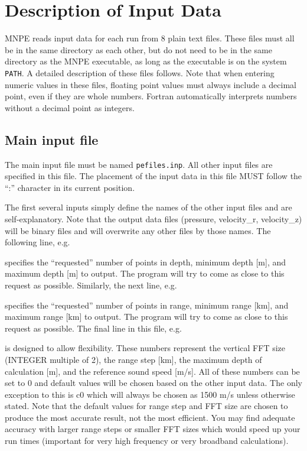 \section{Description of Input Data}

MNPE reads input data for each run from 8 plain text files. These files must all be in the same directory as each other, but do not need to be in the same directory as the MNPE executable, as long as the executable is on the system \texttt{PATH}. A detailed description of these files follows. Note that when entering numeric values in these files, floating point values must always include a decimal point, even if they are whole numbers. Fortran automatically interprets numbers without a decimal point as integers.

\subsection{Main input file}

The main input file must be named \texttt{pefiles.inp}. All other input files are specified in this file. The placement of the input data in this file MUST follow the ``:'' character in its current position. 



The first several inputs simply define the names of the other input files and are self-explanatory. Note that the output data files (pressure, velocity\_r, velocity\_z) will be binary files and will overwrite any other files by those names. The following line, e.g.

specifies the ``requested'' number of points in depth, minimum depth [m], and maximum depth [m] to output. The program will try to come as close to this request as possible. Similarly, the next line, e.g.

specifies the ``requested'' number of points in range, minimum range [km], and maximum range [km] to output. The program will try to come as close to this request as possible. The final line in this file, e.g.

is designed to allow flexibility. These numbers represent the vertical FFT size (INTEGER multiple of 2), the range step [km], the maximum depth of calculation [m], and the reference sound speed [m/s]. All of these numbers can be set to 0 and default values will be chosen based on the other input data. The only exception to this is c0 which will always be chosen as 1500 m/s unless otherwise stated. Note that the default values for range step and FFT size are chosen to produce the most accurate result, not the most efficient. You may find adequate accuracy with larger range steps or smaller FFT sizes which would speed up your run times (important for very high frequency or very broadband calculations).

